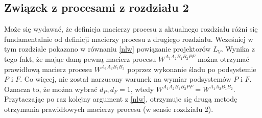 \documentclass[10pt]{article} %
\newcommand{\Ket}[1]{|#1\rangle}
\newcommand{\Bra}[1]{\langle#1|}
\newcommand{\LPV}{{L^\perp_V}}
\begin{document}
\subsection{Związek z procesami z rozdziału 2}
Może się wydawać, że definicja macierzy procesu z aktualnego rozdziału różni się fundamentalnie od definicji macierzy procesu z drugiego rozdziału. Wcześniej w tym rozdziale pokazano w równaniu \eqref{nlw} powiązanie projektorów $L_V$. Wynika z tego fakt, że mając daną pewną macierz procesu $W^{A_1A_2B_1B_2PF}$ można otrzymać prawidłową macierz procesu $W^{A_1A_2B_1B_2}$ poprzez wykonanie śladu po podsystemie $P$ i $F$. Co więcej, nie został narzucony warunek na wymiar podsystemów $P$ i $F$. Oznacza to, że można wybrać $d_P, d_F = 1$, wtedy $W^{A_1A_2B_1B_2PF} = W^{A_1A_2B_1B_2}$. Przytaczając po raz kolejny argument z \eqref{nlw}, otrzymuje się drugą metodę otrzymania prawidłowych macierzy procesu (w sensie rozdziału 2).
\end{document}
